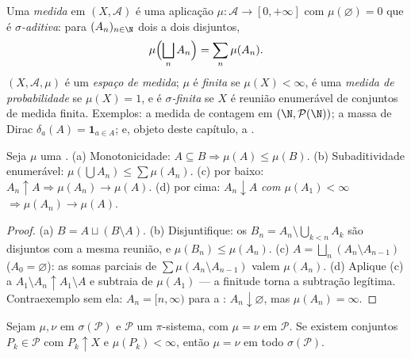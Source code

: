 \begin{definition}\label{def:b3:measure:measure}
Uma \emph{medida} em $(X, \mathcal A)$ é uma aplicação $\mu \colon \mathcal A \to [0, +\infty]$ com $\mu(\varnothing)
= 0$
que é \emph{$\sigma$-aditiva}: para $(A_n)_{n\in\N}$ dois a dois disjuntos,
\[
\mu\Bigl(\bigsqcup_n A_n\Bigr) = \sum_n \mu(A_n).
\]
$(X, \mathcal A, \mu)$ é um \emph{espaço de medida}; $\mu$ é \emph{finita} se $\mu(X) < \infty$, é
uma \emph{medida de probabilidade} se $\mu(X) = 1$, e é
\emph{$\sigma$-finita} se $X$ é reunião enumerável de conjuntos de
medida finita. Exemplos: a medida de contagem em $(\N, \mathcal P(\N))$; a massa de Dirac
$\delta_a(A)
= \mathbf 1_{a \in A}$; e, objeto deste capítulo, a .
\end{definition}

\begin{proposition}\label{prop:b3:measure:basics}
Seja $\mu$ uma . (a) Monotonicidade: $A \subseteq B
\Rightarrow \mu(A) \leq \mu(B)$. (b) Subaditividade
enumerável: $\mu(\bigcup A_n) \leq \sum\mu(A_n)$. (c)  por baixo: $A_n \uparrow A \Rightarrow \mu(A_n) \to \mu(A)$. (d) 
por cima: $A_n \downarrow A$ \emph{com $\mu(A_1) < \infty$} $\Rightarrow \mu(A_n) \to \mu(A)$.
\end{proposition}

\begin{proof}
(a) $B = A \sqcup (B\setminus A)$. (b) Disjuntifique: os $B_n = A_n
\setminus \bigcup_{k<n}A_k$ são disjuntos com a mesma
reunião, e $\mu(B_n) \leq \mu(A_n)$. (c) $A = \bigsqcup_n (A_n
\setminus A_{n-1})$ ($A_0 = \varnothing$): as somas parciais de $\sum\mu(A_n\setminus A_{n-1})$ valem
$\mu(A_n)$. (d) Aplique (c) a $A_1 \setminus A_n \uparrow A_1 \setminus A$ e subtraia de $\mu(A_1)$ --- a finitude torna
a subtração legítima. Contraexemplo sem ela: $A_n = [n, \infty)$ para a : $A_n \downarrow \varnothing$, mas $\mu(A_n) =
\infty$.
\end{proof}

\begin{theorem}[Unicidade]\label{thm:b3:measure:uniqueness}
Sejam $\mu, \nu$  em $\sigma(\mathcal P)$ e $\mathcal
P$ um $\pi$-sistema, com $\mu = \nu$ em
$\mathcal P$. Se existem conjuntos $P_k \in \mathcal P$ com $P_k \uparrow X$ e $\mu(P_k) < \infty$, então $\mu = \nu$ em todo
$\sigma(\mathcal P)$.
\end{theorem}

